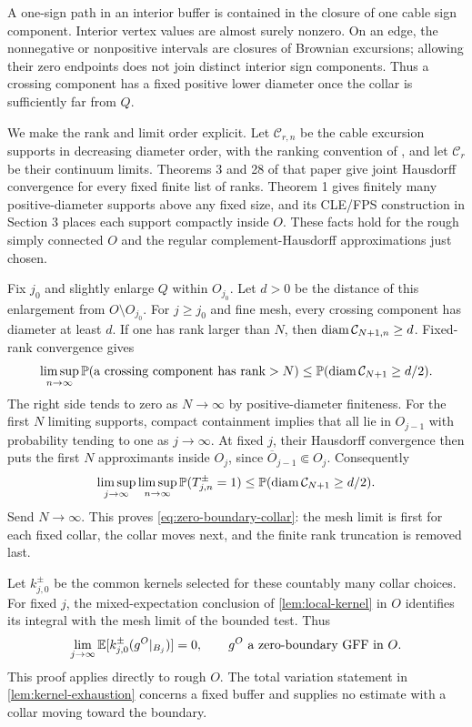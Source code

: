 A one-sign path in an interior buffer is contained in the closure of
one cable sign component. Interior vertex values are almost surely
nonzero. On an edge, the nonnegative or nonpositive intervals are
closures of Brownian excursions; allowing their zero endpoints does
not join distinct interior sign components. Thus a crossing component
has a fixed positive lower diameter once the collar is sufficiently
far from \(Q\).

We make the rank and limit order explicit. Let
\(\mathcal C_{r,n}\) be the cable excursion supports in decreasing
diameter order, with the ranking convention of \cite{ALS2023}, and
let \(\mathcal C_r\) be their continuum limits. Theorems 3 and 28
of that paper give joint Hausdorff convergence for every fixed finite
list of ranks. Theorem 1 gives finitely many positive-diameter supports
above any fixed size, and its CLE/FPS construction in Section 3 places
each support compactly inside \(O\). These facts hold for the rough
simply connected \(O\) and the regular complement-Hausdorff
approximations just chosen.

Fix \(j_0\) and slightly enlarge \(Q\) within \(O_{j_0}\). Let
\(d>0\) be the distance of this enlargement from
\(O\setminus O_{j_0}\). For \(j\ge j_0\) and fine mesh, every crossing
component has diameter at least \(d\). If one has rank larger than \(N\),
then \(\operatorname{diam}\mathcal C_{N+1,n}\ge d\). Fixed-rank convergence gives
\[
 \limsup_{n\to\infty}
 \mathbb P(\text{a crossing component has rank}>N)
 \le \mathbb P(\operatorname{diam}\mathcal C_{N+1}\ge d/2).
\]
The right side tends to zero as \(N\to\infty\) by positive-diameter
finiteness. For the first \(N\) limiting supports, compact containment
implies that all lie in \(O_{j-1}\) with probability tending to one as
\(j\to\infty\). At fixed \(j\), their Hausdorff convergence then puts
the first \(N\) approximants inside \(O_j\), since
\(\overline O_{j-1}\Subset O_j\). Consequently
\[
 \limsup_{j\to\infty}\limsup_{n\to\infty}
       \mathbb P(T_{j,n}^{\pm}=1)
 \le \mathbb P(\operatorname{diam}\mathcal C_{N+1}\ge d/2).
\]
Send \(N\to\infty\). This proves \eqref{eq:zero-boundary-collar}:
the mesh limit is first for each fixed collar, the collar moves next,
and the finite rank truncation is removed last.

Let \(k_{j,0}^{\pm}\) be the common kernels selected for these
countably many collar choices. For fixed \(j\), the mixed-expectation
conclusion of \cref{lem:local-kernel} in \(O\) identifies its integral
with the mesh limit of the bounded test. Thus
\begin{equation}
       \lim_{j\to\infty}
       \mathbb E[k_{j,0}^{\pm}(g^O|_{B_j})]=0,
       \qquad g^O\text{ a zero-boundary GFF in }O.
 \label{eq:zero-boundary-kernel}
\end{equation}
This proof applies directly to rough \(O\). The total variation statement
in \cref{lem:kernel-exhaustion} concerns a fixed buffer and supplies no
estimate with a collar moving toward the boundary.

